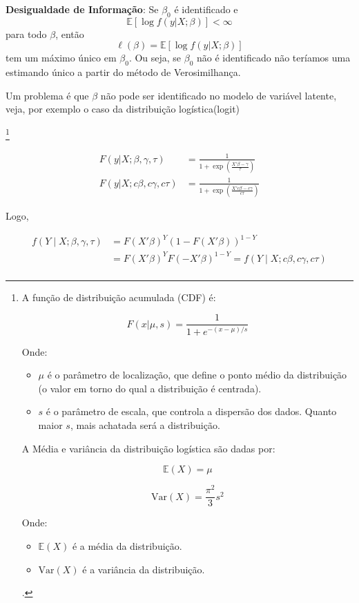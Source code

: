 \documentclass[12pt, a4paper, openany]{book}
\numberwithin{equation}{chapter}
\numberwithin{table}{chapter}
\numberwithin{figure}{chapter}
\theoremstyle{break}
\begin{document}
\textbf{Desigualdade de Informação}: Se \(\beta_0\) é identificado e 
    \[
    \mathbb{E}[\log f(y | X; \beta)] < \infty
    \]
    para todo \(\beta\), então
    \[
    \ell(\beta) = \mathbb{E}[\log f(y | X; \beta)]
    \]
    tem um máximo único em \(\beta_0\). Ou seja, se \(\beta_0\) não é identificado não teríamos uma estimando único a partir do método de Verosimilhança. 


Um problema é que \(\beta\) não pode ser identificado no modelo de variável latente, veja, por exemplo o caso da distribuição logística(logit)

\footnote{A função de distribuição acumulada (CDF) é:

\[
F(x|\mu, s) = \frac{1}{1 + e^{-(x - \mu)/s}}
\]


Onde:
\begin{itemize}
    \item \( \mu \) é o parâmetro de localização, que define o ponto médio da distribuição (o valor em torno do qual a distribuição é centrada).
    \item \( s \) é o parâmetro de escala, que controla a dispersão dos dados. Quanto maior \( s \), mais achatada será a distribuição.
\end{itemize}



A Média e variância da distribuição logística são dadas por:

\[
\mathbb{E}(X) = \mu
\]

\[
\text{Var}(X) = \frac{\pi^2}{3}s^2
\]

Onde:
\begin{itemize}
    \item \( \mathbb{E}(X) \) é a média da distribuição.
    \item \( \text{Var}(X) \) é a variância da distribuição.
\end{itemize}. 

}


\begin{align*}
    F(y | X; \beta,\gamma,\tau )  &=  \frac{1}{1 + \exp\left( \frac{ X'\beta  - \gamma}{\tau} \right)} \\
    F(y | X; c\beta,c\gamma,c\tau ) & =  \frac{1}{1 + \exp\left( \frac{ X' c \beta   - c\gamma}{c\tau} \right)} 
\end{align*}


Logo, 


\begin{align*}
    f(Y \mid X;\beta,\gamma,\tau) &= F(X'\beta)^Y (1 - F(X'\beta))^{1-Y}  \\
                  &= F(X'\beta)^Y F(-X'\beta)^{1-Y} = f(Y \mid X;c\beta,c\gamma,c\tau)  \\
\end{align*} 
\end{document}
